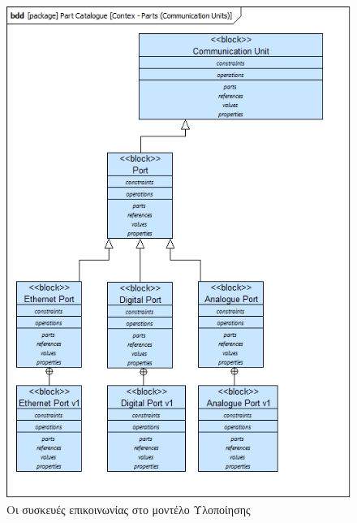 \documentclass[a4paper,12pt,twoside]{report}
\begin{document}
{\begin{appendices}
				\clearpage
				\begin{figure}[hp]
					\centering
					\includegraphics[scale=0.50]{DesignModel_Contex-Parts(CommunicationUnits).png}
					\caption{Οι συσκευές επικοινωνίας στο μοντέλο Υλοποίησης}
					\label{φωτ:Οι συσκευές επικοινωνίας στο μοντέλο Υλοποίησης}
				\end{figure}


\end{appendices}}
\end{document}
